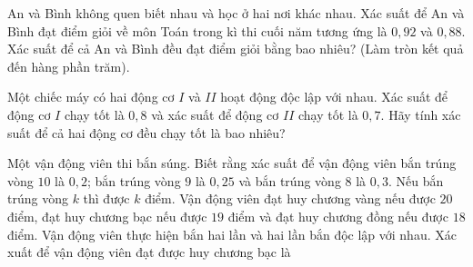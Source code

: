 \begin{ex}%
	An và  Bình không quen biết nhau và học ở hai nơi khác nhau. Xác suất để An và Bình đạt điểm giỏi về môn Toán trong kì thi cuối năm tương ứng là $0{,}92$ và $0{,}88$. Xác suất để cả An và Bình đều đạt điểm giỏi bằng bao nhiêu? (Làm tròn kết quả đến hàng phần trăm).
\end{ex}

\begin{ex}%
	Một chiếc máy có hai động cơ $I$ và $II$ hoạt động độc lập với nhau. Xác suất để động cơ $I$ chạy tốt là $0{,}8$ và xác suất để động cơ $II$ chạy  tốt là $0{,}7$. Hãy tính xác suất để cả hai động cơ đều chạy tốt là bao nhiêu?
\end{ex}

\begin{ex}%
	Một vận động viên thi bắn súng. Biết rằng xác suất để vận động viên bắn trúng vòng $10$ là $0{,}2$; bắn trúng vòng $9$ là $0{,}25$ và bắn trúng vòng $8$ là $0{,}3$. Nếu bắn trúng vòng $k$ thì được $k$ điểm. Vận động viên đạt huy chương vàng nếu được $20$ điểm, đạt huy chương bạc nếu được $19$ điểm và đạt huy chương đồng nếu được $18$ điểm. Vận động viên thực hiện bắn hai  lần và hai lần bắn độc lập với nhau. Xác xuất để vận động viên đạt được huy chương bạc là
\end{ex}

